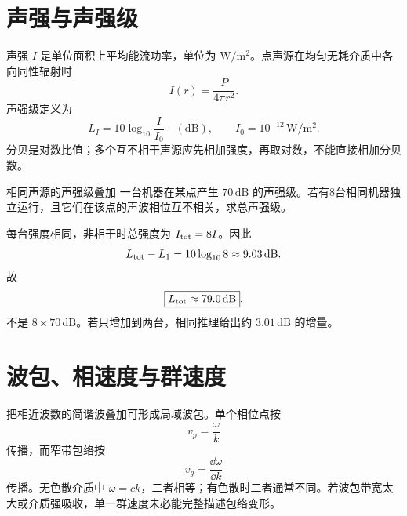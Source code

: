 \section{声强与声强级}

声强 $I$ 是单位面积上平均能流功率，单位为 $\mathrm{W/m^2}$。点声源在均匀无耗介质中各向同性辐射时
\begin{equation}
 I(r)=\frac{P}{4\pi r^2}.
\end{equation}
声强级定义为
\begin{equation}
 L_I=10\log_{10}\frac I{I_0}\quad(\mathrm{dB}),
 \qquad I_0=10^{-12}\,\mathrm{W/m^2}.
\end{equation}
分贝是对数比值；多个互不相干声源应先相加强度，再取对数，不能直接相加分贝数。

\begin{origexamplebox}{相同声源的声强级叠加}
\label{ch12:ex:05}
一台机器在某点产生 $70\,\mathrm{dB}$ 的声强级。若有8台相同机器独立运行，且它们在该点的声波相位互不相关，求总声强级。
\end{origexamplebox}
\begin{xesolution}
每台强度相同，非相干时总强度为 $I_{\rm tot}=8I$。因此
\[
 L_{\rm tot}-L_1=10\log_{10}8\approx9.03\,\mathrm{dB}.
\]
故
\[
 \boxed{L_{\rm tot}\approx79.0\,\mathrm{dB}}.
\]
不是 $8\times70\,\mathrm{dB}$。若只增加到两台，相同推理给出约 $3.01\,\mathrm{dB}$ 的增量。
\end{xesolution}


\section{波包、相速度与群速度}

把相近波数的简谐波叠加可形成局域波包。单个相位点按
\begin{equation}
 v_p=\frac\omega k
\end{equation}
传播，而窄带包络按
\begin{equation}
 v_g=\frac{\dd\omega}{\dd k}
\end{equation}
传播。无色散介质中 $\omega=ck$，二者相等；有色散时二者通常不同。若波包带宽太大或介质强吸收，单一群速度未必能完整描述包络变形。

